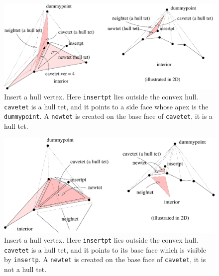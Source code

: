 \begin{figure}
  \centering
  \includegraphics[width=1.0\textwidth]{../figs/bowyerwatson2}
\caption{Insert a hull vertex. Here {\tt insertpt} lies outside the convex hull. {\tt cavetet} is a hull tet, and it points to a side face whose apex is the {\tt dummypoint}. A {\tt newtet} is created on the base face of {\tt cavetet}, it is a hull tet.}
\label{fig:bowyerwatson2}
\end{figure}

\begin{figure}
  \centering
  \includegraphics[width=1.0\textwidth]{../figs/bowyerwatson3}
\caption{Insert a hull vertex. Here {\tt insertpt} lies outside the convex hull. {\tt cavetet} is a hull tet, and it points to its base face which is visible by {\tt insertp}. A {\tt newtet} is created on the base face of {\tt cavetet}, it is not a hull tet.}
\label{bowyerwatson3}
\end{figure}
